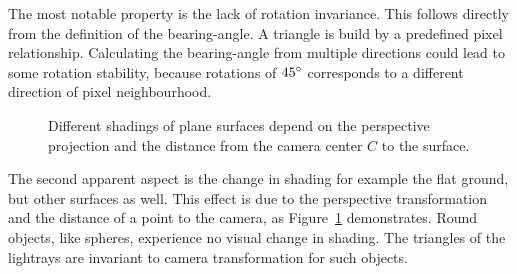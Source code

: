 The most notable property is the lack of rotation invariance.
This follows directly from the definition of the \gls{bearing-angle}.
A triangle is build by a predefined pixel relationship.
Calculating the \gls{bearing-angle} from multiple directions could lead to some rotation stability, because rotations of $45\degree$ corresponds to a different direction of pixel neighbourhood.
\begin{figure}[H]
    \centering
    \caption[Two Bearing-Angles for the same ground plane]{Different shadings of plane surfaces depend on the perspective projection and the distance from the camera center $C$ to the surface.}\label{fig:bearing_angle_shading}
\end{figure}
The second apparent aspect is the change in shading for example the flat ground, but other surfaces as well.
This effect is due to the perspective transformation and the distance of a point to the camera, as Figure~\ref{fig:bearing_angle_shading} demonstrates.
Round objects, like spheres, experience no visual change in shading.
The triangles of the lightrays are invariant to camera transformation for such objects.
